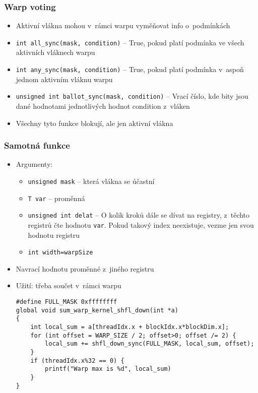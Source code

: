 \subsubsection{Warp voting}
\begin{itemize}
    \item Aktivní vlákna mohou v~rámci warpu vyměňovat info o~podmínkách
    \item \texttt{int all\_sync(mask, condition)} -- True, pokud platí podmínka ve všech aktivních vláknech warpu
    \item \texttt{int any\_sync(mask, condition)} -- True, pokud platí podmínka v~aspoň jednom aktivním vláknu warpu
    \item \texttt{unsigned int ballot\_sync(mask, condition)} -- Vrací číslo, kde bity jsou dané hodnotami jednotlivých hodnot condition z~vláken
    \item Všechny tyto funkce blokují, ale jen aktivní vlákna
\end{itemize}
\subsubsection{Samotná funkce}
\begin{itemize}
    \item Argumenty:
    \begin{itemize}
        \item \texttt{unsigned mask} -- která vlákna se účastní
        \item \texttt{T var} -- proměnná
        \item \texttt{unsigned int delat} -- O kolik kroků dále se dívat na registry, z~těchto registrů čte hodnotu \texttt{var}. Pokud takový index neexistuje, vezme jen svou hodnotu registru
        \item \texttt{int width=warpSize}
    \end{itemize}
    \item Navrací hodnotu proměnné z~jiného registru
    \item Užití: třeba součet v~rámci warpu
\begin{verbatim}
#define FULL_MASK 0xffffffff
global void sum_warp_kernel_shfl_down(int *a)
{
    int local_sum = a[threadIdx.x + blockIdx.x*blockDim.x];
    for (int offset = WARP_SIZE / 2; offset>0; offset /= 2) {
        local_sum += shfl_down_sync(FULL_MASK, local_sum, offset);
    }
    if (threadIdx.x%32 == 0) {
        printf("Warp max is %d", local_sum)
    }
}
\end{verbatim}
\end{itemize}

